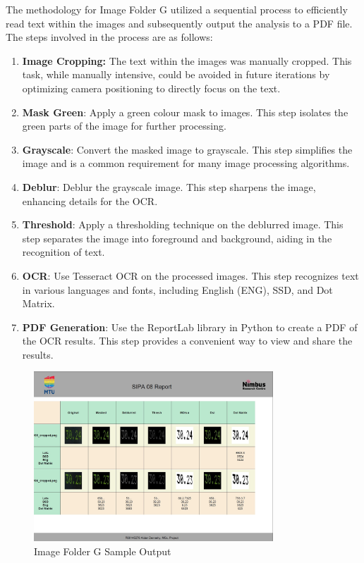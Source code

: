 The methodology for Image Folder G utilized a sequential process to efficiently read text within the images and subsequently output the analysis to a PDF file. The steps involved in the process are as follows:


\begin{enumerate}
    \item \textbf{Image Cropping:} The text within the images was manually cropped. This task, while manually intensive, could be avoided in future iterations by optimizing camera positioning to directly focus on the text.
    \item \textbf{Mask Green}: Apply a green colour mask to images. This step isolates the green parts of the image for further processing.
    \item \textbf{Grayscale}: Convert the masked image to grayscale. This step simplifies the image and is a common requirement for many image processing algorithms.
    \item \textbf{Deblur}: Deblur the grayscale image. This step sharpens the image, enhancing details for the OCR.
    \item \textbf{Threshold}: Apply a thresholding technique on the deblurred image. This step separates the image into foreground and background, aiding in the recognition of text.
    \item \textbf{OCR}: Use Tesseract OCR on the processed images. This step recognizes text in various languages and fonts, including English (ENG), SSD, and Dot Matrix.
    \item \textbf{PDF Generation}: Use the ReportLab library in Python to create a PDF of the OCR results. This step provides a convenient way to view and share the results.
\end{enumerate}

\begin{figure}[ht]
    \centering
    \includegraphics[width=0.8\textwidth]{Figures/Methodology/sipa_08/sample_output.jpg}
    \caption[Image Folder G Sample Output]{Image Folder G Sample Output}
    \label{fig:Image Folder G Sample Output}
\end{figure}


